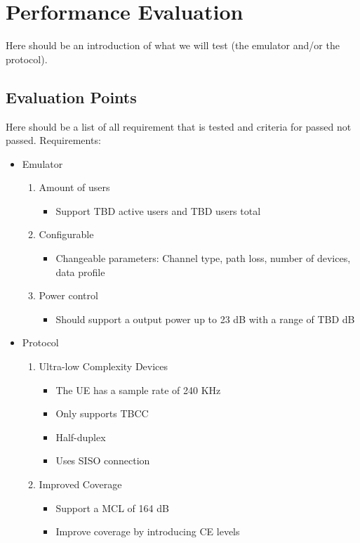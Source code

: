 \chapter{Performance Evaluation}
Here should be an introduction of what we will test (the emulator and/or the protocol). 
\section{Evaluation Points}
Here should be a list of all requirement that is tested and criteria for passed not passed. 
Requirements: 
\begin{itemize}
\item Emulator
	\begin{enumerate}
	\item Amount of users %
		\begin{itemize}
		\item Support TBD active users and TBD users total
		\end{itemize}
	\item Configurable %
		\begin{itemize}
		\item Changeable parameters: Channel type, path loss, number of devices, data profile
		\end{itemize}
	\item Power control 
		\begin{itemize}
		\item Should support a output power up to 23 dB with a range of TBD dB
		\end{itemize}
	\end{enumerate}
\item Protocol
	\begin{enumerate}[resume]
	\item  Ultra-low Complexity Devices
		\begin{itemize}
		\item The \gls{UE} has a sample rate of 240 KHz
		\item Only supports \gls{TBCC}
		\item Half-duplex
		\item Uses \gls{SISO} connection
		\end{itemize}
	\item Improved Coverage
		\begin{itemize}
		\item Support a \gls{MCL} of 164 dB
		\item Improve coverage by introducing \gls{CE} levels 

\end{itemize}
\end{enumerate}
\end{itemize}
